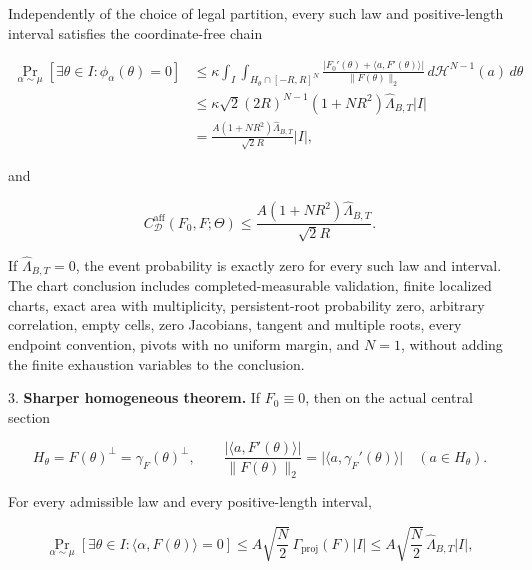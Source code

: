 \begin{proposition}
   Independently of the choice of legal partition, every such law and positive-length interval satisfies the
   coordinate-free chain
   
\begin{equation}
\label{eq:appendix-indented-039}
   \begin{aligned}
   \Pr_{\alpha\sim\mu}[\exists\theta\in I:\phi_\alpha(\theta)=0]
   &\leq
   \kappa\int_I\int_{H_\theta\cap[-R,R]^N}
   \frac{\lvert F_0'(\theta)+\langle a,F'(\theta)\rangle\rvert}
   {\lVert F(\theta)\rVert_2}
   \,d\mathcal H^{N-1}(a)\,d\theta\\
   &\leq
   \kappa\sqrt2(2R)^{N-1}(1+NR^2)\widehat\Lambda_{B,T}\lvert I\rvert\\
   &=\frac{A(1+NR^2)\widehat\Lambda_{B,T}}{\sqrt2R}\lvert I\rvert,
   \end{aligned}
\end{equation}
   
   and
   
\begin{equation}
\label{eq:appendix-indented-040}
   C^{\mathrm{aff}}_{\mathcal D}(F_0,F;\Theta)
   \leq\frac{A(1+NR^2)\widehat\Lambda_{B,T}}{\sqrt2R}.
\end{equation}
   
   If \(\widehat\Lambda_{B,T}=0\), the event probability is exactly zero for every such law and interval.
   The chart conclusion includes completed-measurable validation, finite localized charts, exact area with
   multiplicity, persistent-root probability zero, arbitrary correlation, empty cells, zero Jacobians,
   tangent and multiple roots, every endpoint convention, pivots with no uniform margin, and \(N=1\), without
   adding the finite exhaustion variables to the conclusion.

3. \textbf{Sharper homogeneous theorem.} If \(F_0\equiv0\), then on the actual central section
   
\begin{equation}
\label{eq:appendix-indented-041}
   H_\theta=F(\theta)^\perp=\gamma_F(\theta)^\perp,
   \qquad
   \frac{\lvert\langle a,F'(\theta)\rangle\rvert}{\lVert F(\theta)\rVert_2}
   =\lvert\langle a,\gamma_F'(\theta)\rangle\rvert
   \quad(a\in H_\theta).
\end{equation}
   
   For every admissible law and every positive-length interval,
   
\begin{equation}
\label{eq:appendix-indented-042}
   \Pr_{\alpha\sim\mu}[\exists\theta\in I:\langle\alpha,F(\theta)\rangle=0]
   \leq A\sqrt{\frac N2}\,\Gamma_{\mathrm{proj}}(F)\lvert I\rvert
   \leq A\sqrt{\frac N2}\,\widehat\Lambda_{B,T}\lvert I\rvert,
\end{equation}
   

\end{proposition}
